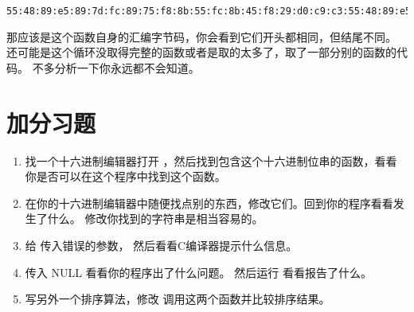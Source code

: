 \begin{Verbatim}
55:48:89:e5:89:7d:fc:89:75:f8:8b:55:fc:8b:45:f8:29:d0:c9:c3:55:48:89:e5:89:
\end{Verbatim}

那应该是这个函数自身的汇编字节码，你会看到它们开头都相同，但结尾不同。 还可能是这个循环没取得完整的函数或者是取的太多了，取了一部分别的函数的代码。 不多分析一下你永远都不会知道。

\section{加分习题}

\begin{enumerate}
\item 找一个十六进制编辑器打开 ，然后找到包含这个十六进制位串的函数，看看你是否可以在这个程序中找到这个函数。
\item 在你的十六进制编辑器中随便找点别的东西，修改它们。回到你的程序看看发生了什么。  修改你找到的字符串是相当容易的。
\item 给  传入错误的参数， 然后看看C编译器提示什么信息。
\item 传入 NULL 看看你的程序出了什么问题。 然后运行  看看报告了什么。
\item 写另外一个排序算法，修改  调用这两个函数并比较排序结果。
\end{enumerate}


